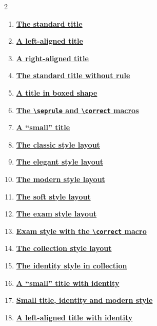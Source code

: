 \documentclass[a4paper,11pt]{article}
\begin{document}
\begin{multicols}{2}
\begin{enumerate}[\bfseries 1.]
	\item \hyperlink{schooldocs-example-center}{\bfseries The standard title}
	\item \hyperlink{schooldocs-example-left}{\bfseries A left-aligned title}
	\item \hyperlink{schooldocs-example-right}{\bfseries A right-aligned title}
	\item \hyperlink{schooldocs-example-norule}{\bfseries
		The standard title without rule}
	\item \hyperlink{schooldocs-example-boxed}{\bfseries A title in boxed shape}
	\item \hyperlink{schooldocs-example-seprule}{\bfseries
		The \texttt{\textbackslash seprule} and \texttt{\textbackslash correct} macros}
	\item \hyperlink{schooldocs-example-small}{\bfseries A ``small'' title}
	\item \hyperlink{schooldocs-example-classic}{\bfseries The classic style layout}
	\item \hyperlink{schooldocs-example-elegant}{\bfseries The elegant style layout}
	\item \hyperlink{schooldocs-example-modern}{\bfseries The modern style layout}
	\item \hyperlink{schooldocs-example-soft}{\bfseries The soft style layout}
	\item \hyperlink{schooldocs-example-exam}{\bfseries The exam style layout}
	\item \hyperlink{schooldocs-example-examcorrect}{\bfseries
		Exam style with the \texttt{\textbackslash correct} macro}
	\item \hyperlink{schooldocs-example-collection}{\bfseries The collection style layout}
	\item \hyperlink{schooldocs-example-identity}{\bfseries 
		The identity style in collection}
	\item \hyperlink{schooldocs-example-small-identity}{\bfseries 
		A ``small'' title with identity}
	\item \hyperlink{schooldocs-example-modern-small-identity}{\bfseries 
		Small title, identity and modern style}
	\item \hyperlink{schooldocs-example-left-identity}{\bfseries 
		A left-aligned title with identity}
\end{enumerate}
\end{multicols}
\end{document}
